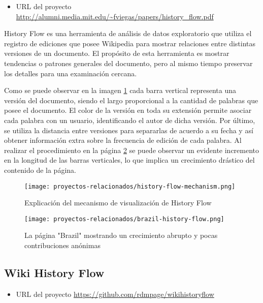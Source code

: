 \begin{itemize}
    \item URL del proyecto \url{http://alumni.media.mit.edu/~fviegas/papers/history_flow.pdf} \cite{HistoryFlowVisualizations}
\end{itemize}

History Flow es una herramienta de análisis de datos exploratorio que utiliza el registro de ediciones que posee Wikipedia para mostrar relaciones entre distintas versiones de un documento. El propósito de esta herramienta es mostrar tendencias o patrones generales del documento, pero al mismo tiempo preservar los detalles para una examinación cercana.

Como se puede observar en la imagen \ref{fig:history-flow-mechanism} cada barra vertical representa una versión del documento, siendo el largo proporcional a la cantidad de palabras que posee el documento. El color de la versión en toda su extensión permite asociar cada palabra con un usuario, identificando el autor de dicha versión. Por último, se utiliza la distancia entre versiones para separarlas de acuerdo a su fecha y así obtener información extra sobre la frecuencia de edición de cada palabra. Al realizar el procedimiento en la página  \ref{fig:brazil-history-flow} se puede observar un evidente incremento en la longitud de las barras verticales, lo que implica un crecimiento drástico del contenido de la página.

\begin{figure}[H]
    \centering
    \texttt{[image: proyectos-relacionados/history-flow-mechanism.png]}
    \caption{Explicación del mecanismo de visualización de History Flow \cite{HistoryFlowVisualizations}}
    \label{fig:history-flow-mechanism}
\end{figure}

\begin{figure}[H]
    \centering
    \texttt{[image: proyectos-relacionados/brazil-history-flow.png]}
    \caption{La página "Brazil" mostrando un crecimiento abrupto y pocas contribuciones anónimas}
    \label{fig:brazil-history-flow}
\end{figure}

\subsection{Wiki History Flow}

\begin{itemize}
    \item URL del proyecto \url{https://github.com/rdmpage/wikihistoryflow}
\end{itemize}

